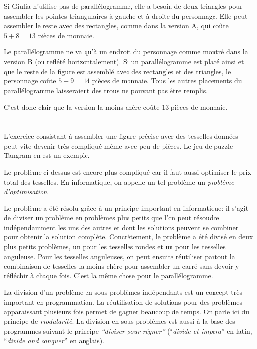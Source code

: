 {{Si Giulia n’utilise pas de parallélogramme, elle a besoin de deux triangles pour assembler les pointes triangulaires à gauche et à droite du personnage. Elle peut assembler le reste avec des rectangles, comme dans la version A, qui coûte ${5 + 8 = 13}$ pièces de monnaie.

Le parallélogramme ne va qu’à un endroit du personnage comme montré dans la version B (ou reflété horizontalement). Si un parallélogramme est placé ainsi et que le reste de la figure est assemblé avec des rectangles et des triangles, le personnage coûte ${5 + 9 = 14}$ pièces de monnaie. Tous les autres placements du parallélogramme laisseraient des trous ne pouvant pas être remplis.

C’est donc clair que la version la moins chère coûte $13$ pièces de monnaie.



\section*{\BrochureItsInformatics}
L’exercice consistant à assembler une figure précise avec des tesselles données peut vite devenir très compliqué même avec peu de pièces. Le jeu de puzzle Tangram en est un exemple.

Le problème ci-dessus est encore plus compliqué car il faut aussi optimiser le prix total des tesselles. En informatique, on appelle un tel problème un \emph{problème d’optimisation}.

Le problème a été résolu grâce à un principe important en informatique: il s’agit de diviser un problème en problèmes plus petits que l’on peut résoudre indépendamment les uns des autres et dont les solutions peuvent se combiner pour obtenir la solution complète. Concrètement, le problème a été divisé en deux plus petits problèmes, un pour les tesselles rondes et un pour les tesselles anguleuse. Pour les tesselles anguleuses, on peut ensuite réutiliser partout la combinaison de tesselles la moins chère pour assembler un carré sans devoir y réfléchir à chaque fois. C’est la même chose pour le parallélogramme.

La division d’un problème en sous-problèmes indépendants est un concept très important en programmation. La réutilisation de solutions pour des problèmes apparaissant plusieurs fois permet de gagner beaucoup de temps. On parle ici du principe de \emph{modularité}. La division en sous-problèmes est aussi à la base des programmes suivant le principe \emph{“diviser pour régner”} (“\emph{divide et impera}” en latin, “\emph{divide and conquer}” en anglais).



}}
